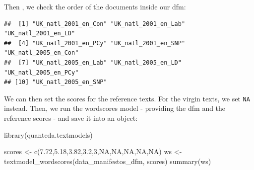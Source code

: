 \documentclass[
]{book}
\newenvironment{Shaded}{\begin{snugshade}}{\end{snugshade}}
\newcommand{\ConstantTok}[1]{\textcolor[rgb]{0.00,0.00,0.00}{#1}}
\newcommand{\DecValTok}[1]{\textcolor[rgb]{0.00,0.00,0.81}{#1}}
\newcommand{\FloatTok}[1]{\textcolor[rgb]{0.00,0.00,0.81}{#1}}
\newcommand{\FunctionTok}[1]{\textcolor[rgb]{0.00,0.00,0.00}{#1}}
\newcommand{\NormalTok}[1]{#1}
\newcommand{\OtherTok}[1]{\textcolor[rgb]{0.56,0.35,0.01}{#1}}
\newcommand{\SpecialCharTok}[1]{\textcolor[rgb]{0.00,0.00,0.00}{#1}}
\begin{document}
Then , we check the order of the documents inside our dfm:

\begin{Shaded}
\end{Shaded}

\begin{verbatim}
##  [1] "UK_natl_2001_en_Con" "UK_natl_2001_en_Lab" "UK_natl_2001_en_LD" 
##  [4] "UK_natl_2001_en_PCy" "UK_natl_2001_en_SNP" "UK_natl_2005_en_Con"
##  [7] "UK_natl_2005_en_Lab" "UK_natl_2005_en_LD"  "UK_natl_2005_en_PCy"
## [10] "UK_natl_2005_en_SNP"
\end{verbatim}

We can then set the scores for the reference texts. For the virgin texts, we set \texttt{NA} instead. Then, we run the wordscores model - providing the dfm and the reference scores - and save it into an object:

\begin{Shaded}
\begin{Highlighting}[]
\FunctionTok{library}\NormalTok{(quanteda.textmodels)}

\NormalTok{scores }\OtherTok{\textless{}{-}} \FunctionTok{c}\NormalTok{(}\FloatTok{7.72}\NormalTok{,}\FloatTok{5.18}\NormalTok{,}\FloatTok{3.82}\NormalTok{,}\FloatTok{3.2}\NormalTok{,}\DecValTok{3}\NormalTok{,}\ConstantTok{NA}\NormalTok{,}\ConstantTok{NA}\NormalTok{,}\ConstantTok{NA}\NormalTok{,}\ConstantTok{NA}\NormalTok{,}\ConstantTok{NA}\NormalTok{)}
\NormalTok{ws }\OtherTok{\textless{}{-}} \FunctionTok{textmodel\_wordscores}\NormalTok{(data\_manifestos\_dfm, scores)}
\FunctionTok{summary}\NormalTok{(ws)}
\end{Highlighting}
\end{Shaded}
\end{document}
